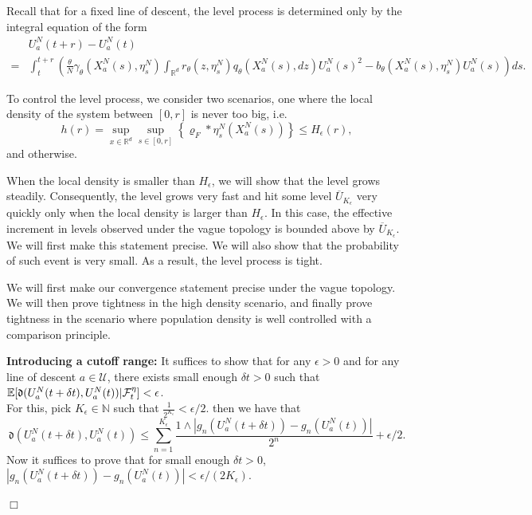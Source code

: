 \documentclass[12pt]{article}
\newenvironment {proof}{{\noindent\bf Proof }}{\hfill $\Box$ \medskip}
\newcommand{\IR}{\mathbb R}
\begin{document}
\begin{proof} Recall that for a fixed line of descent, the level process is determined only by the integral equation of the form 
\begin{align*}
&U^{N}_{a}(t+r)-U^{N}_{a}(t)\\
=&\int_{t}^{t+r}
\left(
        \frac{\theta}{N} \gamma_{\theta}(X^N_{a}(s),\eta^N_s)
        \int_{\IR^d} r_{\theta}(z,\eta^N_s) q_{\theta}(X^N_a(s),dz) U^N_a(s)^2
        -
        b_{\theta}(X^N_a(s),\eta^N_s) U^N_a(s)
    \right)
    ds.
\end{align*}

To control the level process, we consider two scenarios, one where the local density of the system between $[0,r]$ is never too big, i.e.
$$h(r)=\sup_{x \in \mathbb{R}^d}\sup_{s\in [0,r]}\left\{\varrho_F*\eta^N_s(X^N_a(s)) \right\} \leq H_{\epsilon}(r),$$
and otherwise. 

When the local density is smaller than $H_{\epsilon}$, we will show that the level grows steadily. Consequently, the level grows very fast and hit some level $\overline{U}_{K_{\epsilon}}$ very quickly only when the local density is larger than $H_{\epsilon}$. In this case, the effective increment in levels observed under the vague topology is bounded above by $\overline{U}_{K_{\epsilon}}$. We will first make this statement precise. 
We will also show that the probability of such event is very small.
As a result, the level process is tight.

We will first make our convergence statement precise under the vague topology. 
We will then prove tightness in the high density scenario,
and finally
prove tightness in the scenario where population density is well controlled
with a comparison principle.  

\textbf{Introducing a cutoff range:} It suffices to show that for any $\epsilon > 0$ and for any line of descent $a \in \mathcal{U}$, there exists small enough  $\delta t>0$ such that $\mathbb{E}[\mathfrak{d}(U^{N}_{a}(t+\delta t),U^{N}_{a}(t))|{\cal F}_t^{
\eta}]< \epsilon$. \\
For this, pick $K_{\epsilon} \in \mathbb{N}$ such that $\frac{1}{2^{K_{\epsilon}}} < \epsilon/2$. then we have that 
\begin{equation}
\mathfrak{d}(U^{N}_{a}(t+\delta t),U^{N}_{a}(t))\leq  \sum_{n=1}^{K_{\epsilon}}\frac{1 \wedge |g_n(U^{N}_{a}(t+\delta t))-g_n(U^{N}_{a}(t))|}{2^n} +  \epsilon/2. 
\end{equation}
Now it suffices to prove that for small enough $\delta t>0$, $|g_n(U^{N}_{a}(t+\delta t))-g_n(U^{N}_{a}(t))| < \epsilon / (2K_{\epsilon})$. 


\end{proof}
\end{document}
